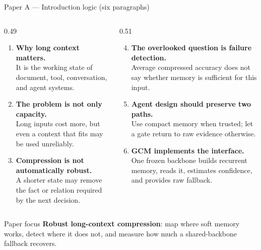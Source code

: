 \begin{frame}{Paper A --- Introduction logic (six paragraphs)}
  \begin{columns}[T]
  \begin{column}{0.49\textwidth}
    \begin{enumerate}\small
      \item \textbf{Why long context matters.}\\
      It is the working state of document, tool, conversation, and agent systems.
      \vspace{0.5em}
      \item \textbf{The problem is not only capacity.}\\
      Long inputs cost more, but even a context that fits may be used unreliably.
      \vspace{0.5em}
      \item \textbf{Compression is not automatically robust.}\\
      A shorter state may remove the fact or relation required by the next decision.
    \end{enumerate}
  \end{column}
  \begin{column}{0.51\textwidth}
    \begin{enumerate}\setcounter{enumi}{3}\small
      \item \textbf{The overlooked question is failure detection.}\\
      Average compressed accuracy does not say whether memory is sufficient for this input.
      \vspace{0.5em}
      \item \textbf{Agent design should preserve two paths.}\\
      Use compact memory when trusted; let a gate return to raw evidence otherwise.
      \vspace{0.5em}
      \item \textbf{GCM implements the interface.}\\
      One frozen backbone builds recurrent memory, reads it, estimates confidence, and provides raw fallback.
    \end{enumerate}
  \end{column}
  \end{columns}
  \begin{block}{Paper focus}
    \footnotesize \textbf{Robust long-context compression}: map where soft memory works, detect where it does
    not, and measure how much a shared-backbone fallback recovers.
  \end{block}
\end{frame}


